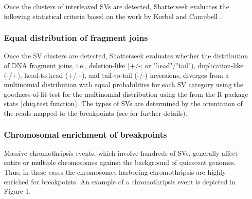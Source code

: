 \documentclass[twoside,a4wide,11pt]{article}\usepackage[]{graphicx}\usepackage[]{color}
\begin{document}
Once the clusters of interleaved SVs are detected, Shatterseek evaluates the following statistical criteria based on the work by Korbel and Campbell \cite{Korbel2013}.


\subsubsection{Equal distribution of fragment joins}

Once the SV clusters are detected, Shatterseek evaluates whether the distribution of DNA fragment joins,
i.e., deletion-like (+/-; or "head"/"tail"), duplication-like (-/+), head-to-head (+/+), and tail-to-tail (-/-) inversions,
diverges from a multinomial distribution with equal probabilities for each SV category using the goodness-of-fit test for the multinomial distribution using the from the R package stats (chiq.test function).
The types of SVs are determined by the orientation of the reads mapped to the breakpoints (see \cite{Zhang2013} for further details).

\subsubsection{Chromosomal enrichment of breakpoints}
Massive chromothripsis events, which involve hundreds of SVs,
generally affect entire or multiple chromosomes against the background of 
quiescent genomes.
Thus, in these cases the chromosomes harboring chromothripsis are highly enriched for breakpoints.
An example of a chromothripsis event is depicted in Figure 1.
\end{document}
